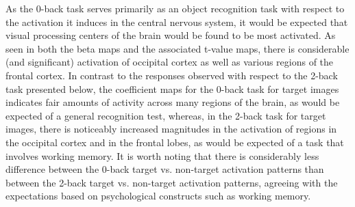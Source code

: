\documentclass[11pt]{article}
\begin{document}
As the 0-back task serves primarily as an object recognition task with respect to the activation it induces in the central nervous system, it would be expected that visual processing centers of the brain would be found to be most activated. As seen in both the beta maps and the associated t-value maps, there is considerable (and significant) activation of occipital cortex as well as various regions of the frontal cortex. In contrast to the responses observed with respect to the 2-back task presented below, the coefficient maps for the 0-back task for target images indicates fair amounts of activity across many regions of the brain, as would be expected of a general recognition test, whereas, in the 2-back task for target images, there is noticeably increased magnitudes in the activation of regions in the occipital cortex and in the frontal lobes, as would be expected of a task that involves working memory. It is worth noting that there is considerably less difference between the 0-back target vs. non-target activation patterns than between the 2-back target vs. non-target activation patterns, agreeing with the expectations based on psychological constructs such as working memory.
\end{document}
